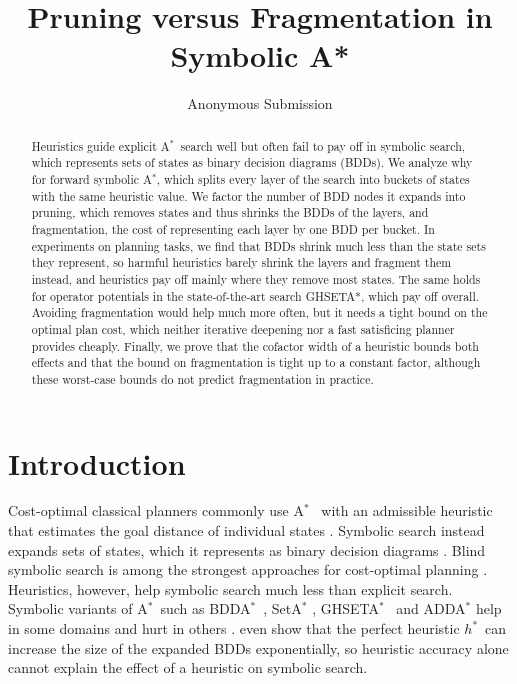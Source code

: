 \documentclass[letterpaper]{article}
\title{Pruning versus Fragmentation in Symbolic A*}
\author{Anonymous Submission}
\newcommand{\hstar}{\ensuremath{h^{*}}}
\newcommand{\bddastar}{BDDA\ensuremath{^{*}}}
\newcommand{\astar}{A\ensuremath{^{*}}}
\newcommand{\ghseta}{GHSETA\ensuremath{^{*}}}
\newcommand{\num}[1]{\numprint{#1}}
\theoremstyle{plain}
\theoremstyle{definition}
\theoremstyle{remark}
\begin{document}
\maketitle

\begin{abstract}
Heuristics guide explicit \astar\ search well but often fail to pay off in symbolic search, which represents sets of states as binary decision diagrams (BDDs).
We analyze why for forward symbolic \astar, which splits every layer of the search into buckets of states with the same heuristic value.
We factor the number of BDD nodes it expands into pruning, which removes states and thus shrinks the BDDs of the layers, and fragmentation, the cost of representing each layer by one BDD per bucket.
In experiments on \num{\HoldoutTasks} planning tasks, we find that BDDs shrink much less than the state sets they represent, so harmful heuristics barely shrink the layers and fragment them instead, and heuristics pay off mainly where they remove most states.
The same holds for operator potentials in the state-of-the-art search GHSETA*, which pay off overall.
Avoiding fragmentation would help much more often, but it needs a tight bound on the optimal plan cost, which neither iterative deepening nor a fast satisficing planner provides cheaply.
Finally, we prove that the cofactor width of a heuristic bounds both effects and that the bound on fragmentation is tight up to a constant factor, although these worst-case bounds do not predict fragmentation in practice.
\end{abstract}

\section{Introduction}

Cost-optimal classical planners commonly use \astar\ \citep{hart-et-al-ieeessc1968} with an admissible heuristic that estimates the goal distance of individual states \citep{pearl-1984}.
Symbolic search instead expands sets of states, which it represents as binary decision diagrams \citep[BDDs;][]{bryant-ieeecomp1986,mcmillan-1993,edelkamp-helmert-ecp1999}.
Blind symbolic search is among the strongest approaches for cost-optimal planning \citep{torralba-et-al-aij2017,speck-ipc2023,speck-et-al-jair2025}.
Heuristics, however, help symbolic search much less than explicit search.
Symbolic variants of \astar\ such as \bddastar\ \citep{edelkamp-reffel-ki1998}, SetA\ensuremath{^{*}} \citep{jensen-et-al-aaai2002}, \ghseta\ \citep{jensen-et-al-aij2008} and ADDA\ensuremath{^{*}} \citep{hansen-et-al-sara2002} help in some domains and hurt in others \citep{torralba-phd2015,torralba-et-al-aij2017}.
\citet{speck-et-al-icaps2020} even show that the perfect heuristic \hstar\ can increase the size of the expanded BDDs exponentially, so heuristic accuracy alone cannot explain the effect of a heuristic on symbolic search.
\end{document}
